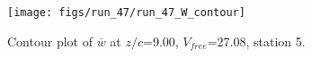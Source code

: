 \begin{figure}[H]
\centering
\texttt{[image: figs/run\_47/run\_47\_W\_contour]}
\caption{Contour plot of $\overline{w}$ at $z/c$=9.00, $V_{free}$=27.08, station 5.}
\label{fig:run_47_W_contour}
\end{figure}


